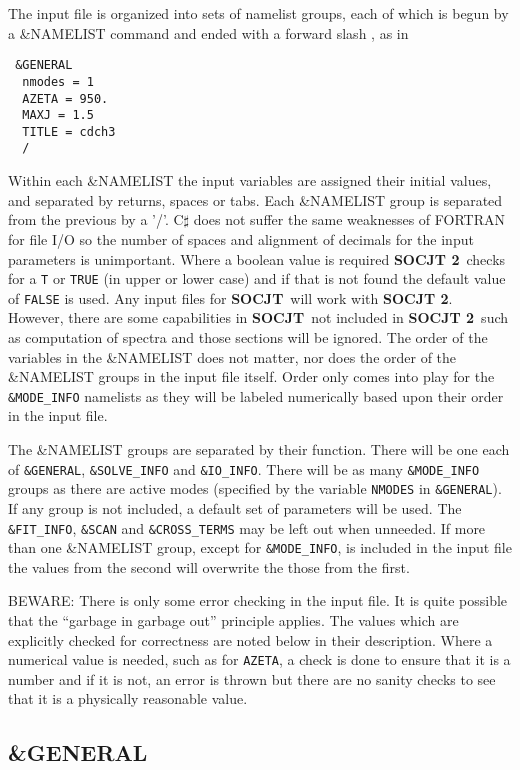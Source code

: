\documentclass{article}
\newcommand{\socjttwo}{{\bf SOCJT 2}}
\newcommand{\socjt}{{\bf SOCJT}}
\begin{document}
The input file is organized into sets of namelist groups, each of
which is begun by a \&NAMELIST command and ended with a forward slash
\/, as in 
\begin{verbatim}
 &GENERAL 
  nmodes = 1
  AZETA = 950.
  MAXJ = 1.5
  TITLE = cdch3 
  /
\end{verbatim}
Within each \&NAMELIST the input variables are assigned their initial
values, and separated by returns, spaces or tabs. Each \&NAMELIST group is separated from
the previous by a '/'. C$\sharp$ does not suffer the same weaknesses of FORTRAN for file I/O
so the number of spaces and alignment of decimals for the input parameters is unimportant.
Where a boolean value is required \socjttwo\ checks for a {\tt T} or {\tt TRUE} (in upper or lower case)
and if that is not found the default value of {\tt FALSE} is used. Any input files for \socjt\ will work
with \socjttwo. However, there are some capabilities in \socjt\ not included in \socjttwo\ such as 
computation of spectra and those sections will be ignored. The order of the variables in
the \&NAMELIST does not matter, nor does the order of the \&NAMELIST
groups in the input file itself. Order only comes into play for the {\tt \&MODE\_INFO} namelists as they will be labeled numerically based upon their order in the input file.

The \&NAMELIST groups are separated by their function. There will be one each of
{\tt \&GENERAL}, {\tt \&SOLVE\_INFO} and {\tt \&IO\_INFO}. There will be as many {\tt \&MODE\_INFO} groups as there are active modes
(specified by the variable {\tt NMODES}  in {\tt \&GENERAL}). If any group is not included,
a default set of parameters will be used. The {\tt \&FIT\_INFO}, {\tt \&SCAN} and {\tt \&CROSS\_TERMS} 
may be left out when unneeded. If more than one
\&NAMELIST group, except for {\tt \&MODE\_INFO}, is included in the input file the values from the second will overwrite the those from the first. 

BEWARE: There is only some error checking in the input file. It is
quite possible that the ``garbage in garbage out'' principle
applies. The values which are explicitly checked for correctness are noted below in their description. Where a numerical value is needed, such as for {\tt AZETA}, a check is done to ensure that it is a number and if it is not, an error is thrown but there are no sanity checks to see that it is a physically reasonable value.
\newpage
\subsection{\&GENERAL}
\end{document}
